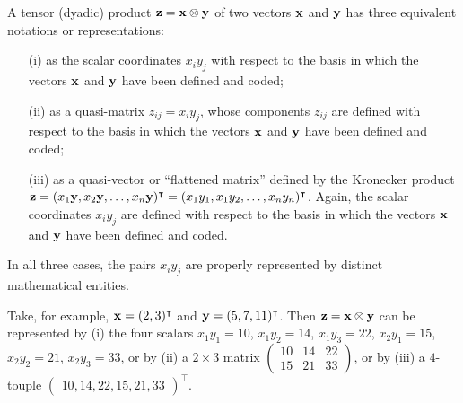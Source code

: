 A tensor (dyadic) product ${\bf z} = {\bf x} \otimes {\bf y}$ of two vectors ${\bf x}$ and ${\bf y}$
has three equivalent notations or representations:
\begin{itemize}
\item[(i)]
as the scalar coordinates $x_iy_j$ with respect to the basis in which the vectors ${\bf  x}$ and ${\bf y}$ have been defined and coded;
\item[(ii)]
as a quasi-matrix $z_{ij}  =x_iy_j$,
whose components $z_{ij}$ are  defined with respect to the basis in which the vectors ${\bf  x}$ and ${\bf y}$
have been defined and coded;
\item[(iii)]
as a quasi-vector or ``flattened matrix'' defined by the Kronecker product
${\bf z} = ({ x}_1  {\bf y}, { x}_2  {\bf y}, \ldots , { x}_n  {\bf y})^\intercal =
({ x}_1  { y}_1, { x}_1  { y}_2, \ldots , { x}_n  { y}_n)^\intercal
$. Again, the scalar coordinates $x_iy_j$ are defined
with respect to the basis in which the vectors ${\bf  x}$ and ${\bf y}$ have been defined and coded.
\end{itemize}
In all three cases, the pairs $x_i y_j$  are properly represented by distinct mathematical entities.

{\color{blue}
\bexample
Take, for example,
${\bf x}=(2,3)^\intercal $
and
${\bf y}=(5,7,11)^\intercal $.
Then ${\bf z} = {\bf x} \otimes {\bf y}$  can be represented by
(i) the four scalars
$x_1y_1=10$,
$x_1y_2=14$,
$x_1y_3=22$,
$x_2y_1=15$,
$x_2y_2=21$,
$x_2y_3=33$,
or by
(ii) a $2 \times 3$ matrix
$
\begin{pmatrix}
10&14&22\\
15&21&33
\end{pmatrix}
$,
or by
(iii) a $4$-touple
$
\begin{pmatrix}  10,14,22,15,21,33\end{pmatrix} ^\intercal
$.
\eexample
}

